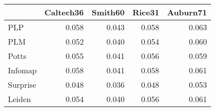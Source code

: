 \begin{tabular}{lrrrr}
\toprule
{} & Caltech36 & Smith60 & Rice31 & Auburn71 \\
\midrule
PLP      &     0.058 &   0.043 &  0.058 &    0.063 \\
PLM      &     0.052 &   0.040 &  0.054 &    0.060 \\
Potts    &     0.055 &   0.041 &  0.056 &    0.059 \\
Infomap  &     0.058 &   0.041 &  0.058 &    0.061 \\
Surprise &     0.048 &   0.036 &  0.048 &    0.053 \\
Leiden   &     0.054 &   0.040 &  0.056 &    0.061 \\
\bottomrule
\end{tabular}
